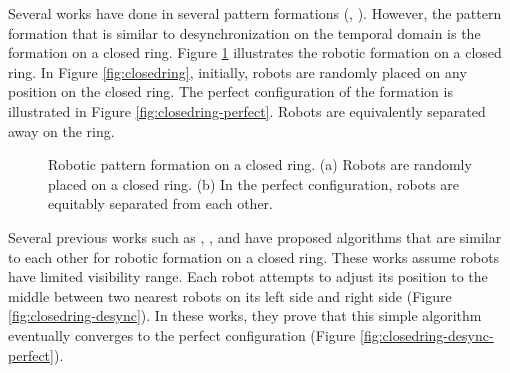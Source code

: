 Several works have done in several pattern formations (\cite{suzuki-96}, \cite{suzuki-99}). However, the pattern formation that is similar to desynchronization on the temporal domain is the formation on a closed ring. 
Figure \ref{fig:robotic-closed-ring} illustrates the robotic formation on a closed ring. In Figure \ref{fig:closedring}, initially, robots are randomly placed on any position on the closed ring. The perfect configuration of the formation is illustrated in Figure \ref{fig:closedring-perfect}. Robots are equivalently separated away on the ring. 

\begin{figure}[!t]
\centerline {
	\hfil
}
\caption{Robotic pattern formation on a closed ring. (a) Robots are randomly placed on a closed ring. (b) In the perfect configuration, robots are equitably separated from each other. }
\label{fig:robotic-closed-ring}
\lofcont
\end{figure}

Several previous works such as \cite{defago04}, \cite{cohen-08}, and \cite{flocchini-08} have proposed algorithms that are similar to each other for robotic formation on a closed ring. These works assume robots have limited visibility range. Each robot attempts to adjust its position to the middle between two nearest robots on its left side and right side (Figure \ref{fig:closedring-desync}). In these works, they prove that this simple algorithm eventually converges to the perfect configuration (Figure \ref{fig:closedring-desync-perfect}).


